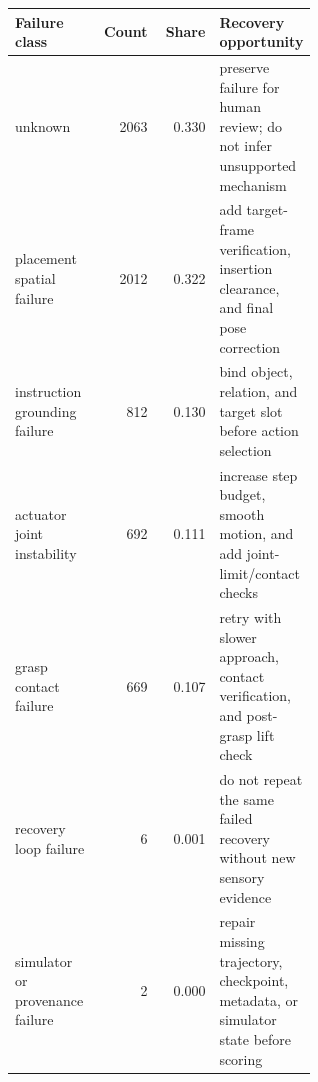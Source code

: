 \begin{tabular}{p{0.28\linewidth}rrp{0.32\linewidth}}
\toprule
Failure class & Count & Share & Recovery opportunity \\
\midrule
unknown & 2063 & 0.330 & preserve failure for human review; do not infer unsupported mechanism \\
placement spatial failure & 2012 & 0.322 & add target-frame verification, insertion clearance, and final pose correction \\
instruction grounding failure & 812 & 0.130 & bind object, relation, and target slot before action selection \\
actuator joint instability & 692 & 0.111 & increase step budget, smooth motion, and add joint-limit/contact checks \\
grasp contact failure & 669 & 0.107 & retry with slower approach, contact verification, and post-grasp lift check \\
recovery loop failure & 6 & 0.001 & do not repeat the same failed recovery without new sensory evidence \\
simulator or provenance failure & 2 & 0.000 & repair missing trajectory, checkpoint, metadata, or simulator state before scoring \\
\bottomrule
\end{tabular}
